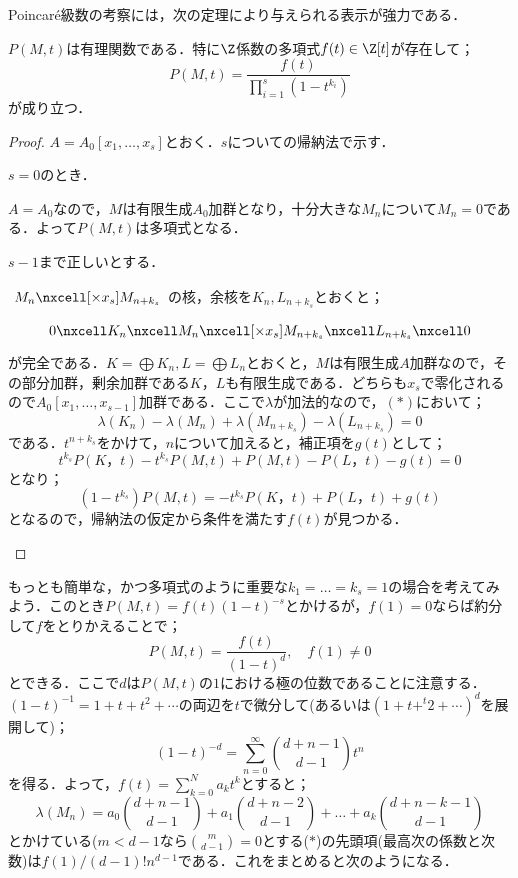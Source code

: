 Poincar\'e級数の考察には，次の定理により与えられる表示が強力である．

\begin{thm}
	$P(M,t)$は有理関数である．特に$\Z$係数の多項式$f(t)\in\Z[t]$が存在して；
	\[P(M,t)=\frac{f(t)}{\prod_{i=1}^s(1-t^{k_i})}\]
	が成り立つ．
\end{thm}

\begin{proof}
	$A=A_0[x_1,\dots,x_s]$とおく．$s$についての帰納法で示す．
	\begin{step}
		\item $s=0$のとき．
		
		$A=A_0$なので，$M$は有限生成$A_0$加群となり，十分大きな$M_n$について$M_n=0$である．よって$P(M,t)$は多項式となる．
		
		\item $s-1$まで正しいとする．
		
		$\begin{tikzcd}
			M_n\nxcell[\times x_s]M_{n+k_s}
		\end{tikzcd}$の核，余核を$K_n,L_{n+k_s}$とおくと；
		\[\begin{tikzcd}
			0\nxcell K_n\nxcell M_n\nxcell[\times x_s]M_{n+k_s}\nxcell L_{n+k_s}\nxcell0
		\end{tikzcd}\]
		が完全である．$K=\bigoplus K_n,L=\bigoplus L_n$とおくと，$M$は有限生成$A$加群なので，その部分加群，剰余加群である$K，L$も有限生成である．どちらも$x_s$で零化されるので$A_0[x_1,\dots,x_{s-1}]$加群である．ここで$\lambda$が加法的なので，$(\ast)$において；
		\[\lambda(K_n)-\lambda(M_n)+\lambda(M_{n+k_s})-\lambda(L_{n+k_s})=0\]
		である．$t^{n+k_s}$をかけて，$n$について加えると，補正項を$g(t)$として；
		\[t^{k_s}P(K，t)-t^{k_s}P(M,t)+P(M,t)-P(L，t)-g(t)=0\]
		となり；
		\[(1-t^{k_s})P(M,t)=-t^{k_s}P(K，t)+P(L，t)+g(t)\]
		となるので，帰納法の仮定から条件を満たす$f(t)$が見つかる．
	\end{step}
\end{proof}

もっとも簡単な，かつ多項式のように重要な$k_1=\dots=k_s=1$の場合を考えてみよう．このとき$P(M,t)=f(t)(1-t)^{-s}$とかけるが，$f(1)=0$ならば約分して$f$をとりかえることで；
\[P(M,t)=\frac{f(t)}{(1-t)^d},\quad f(1)\neq0\]
とできる．ここで$d$は$P(M,t)$の$1$における極の位数であることに注意する．$(1-t)^{-1}=1+t+t^2+\cdots$の両辺を$t$で微分して(あるいは$(1+t+^t2+\cdots)^{d}$を展開して)；
\[(1-t)^{-d}=\sum_{n=0}^\infty\binom{d+n-1}{d-1} t^n\]
を得る．よって，$f(t)=\sum_{k=0}^N a_kt^k$とすると；
\[\lambda(M_n)=a_0\binom{d+n-1}{d-1}+a_1\binom{d+n-2}{d-1}+\dots+a_k\binom{d+n-k-1}{d-1}\tag{$\ast$}\]
とかけている($m<d-1$なら$\binom{m}{d-1}=0$とする($\ast$)の先頭項(最高次の係数と次数)は$f(1)/(d-1)! n^{d-1}$である．これをまとめると次のようになる．


